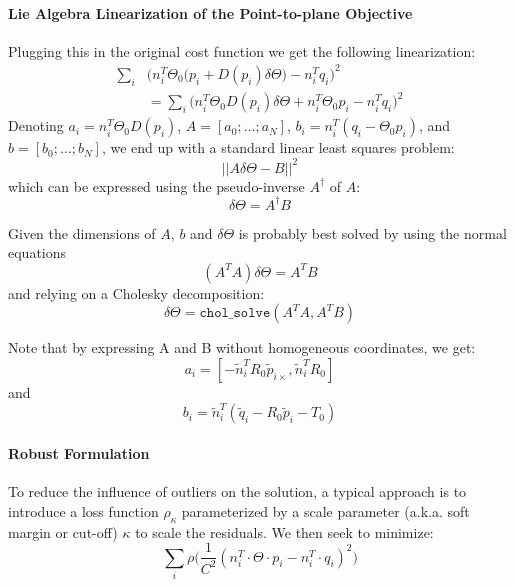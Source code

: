 \paragraph{Lie Algebra Linearization of the Point-to-plane Objective}
Plugging this in the original cost function we get the following linearization:
\begin{equation}
\begin{split}
\sum_i & \Big(n_i^T \Theta_0 \big(p_i + D(p_i)\delta\Theta \big) - n_i^T q_i\Big)^2
\\
&= \sum_i \Big(n_i^T \Theta_0 D(p_i)\delta\Theta + n_i^T \Theta_0 p_i - n_i^T q_i\Big)^2
\end{split}
\end{equation}
Denoting $a_i = n_i^T \Theta_0 D(p_i)$, $A=[a_0;\ldots;a_N]$,
$b_i = n_i^T (q_i - \Theta_0 p_i)$, and $b=[b_0;\ldots;b_N]$, we end up with a standard linear least squares problem:
\begin{equation}
||A \delta\Theta - B||^2
\end{equation}
which can be expressed using the pseudo-inverse $A^{\dagger}$ of $A$:
\begin{equation}
\delta\Theta = A^{\dagger} B
\end{equation}

Given the dimensions of $A$, $b$ and $\delta\Theta$ is probably best solved by using the normal equations
\begin{equation}
(A^T A) \delta\Theta = A^T B
\end{equation}
and relying on a Cholesky decomposition:
\begin{equation}
\delta\Theta = \texttt{chol\_solve}(A^T A, A^T B)
\end{equation}

Note that by expressing A and B without homogeneous coordinates, we get:
\begin{equation}
a_i = [-\tilde{n}_i^T R_0 {{\tilde{p}}_{i\times}}, \tilde{n}_i^T R_0]
\end{equation}
and
\begin{equation}
b_i = \tilde{n}_i^T (\tilde{q}_i - R_0 \tilde{p}_i - T_0)
\end{equation}

\paragraph{Robust Formulation}
To reduce the influence of outliers on the solution, a typical approach is to introduce a
loss function $\rho_\kappa$ parameterized by a scale parameter (a.k.a. soft margin or cut-off) $\kappa$ to scale the residuals. We then seek to minimize:
\iffalse
\begin{equation}
\sum_i \rho\big(\frac{1}{C^2}(n_i^T \cdot \Theta \cdot p_i - n_i^T \cdot q_i)^2\big)
\end{equation}

